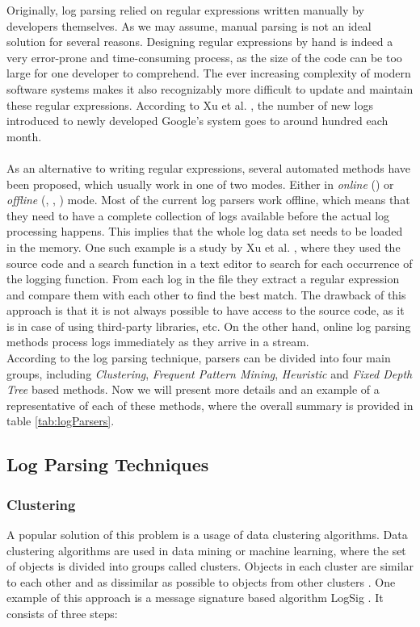 Originally, log parsing relied on regular expressions written manually by developers themselves. As we may assume, manual parsing is not an ideal solution for several reasons. Designing regular expressions by hand is indeed a very error-prone and time-consuming process, as the size of the code can be too large for one developer to comprehend. The ever increasing complexity of modern software systems makes it also recognizably more difficult to update and maintain these regular expressions. According to Xu et al. \cite{xu2009}, the number of new logs introduced to newly developed Google's system goes to around hundred each month. \\
\\
As an alternative to writing regular expressions, several automated methods have been proposed, which usually work in one of two modes. Either in \textit{online} (\cite{drain2017}) or \textit{offline} (\cite{vaarandi2003}, \cite{logsig2011}, \cite{Makanju2009ALA}) mode. Most of the current log parsers work offline, which means that they need to have a complete collection of logs available before the actual log processing happens. This implies that the whole log data set needs to be loaded in the memory. One such example is a study by Xu et al. \cite{xu2008}, where they used the source code and a search function in a text editor to search for each occurrence of the logging function. From each log in the file they extract a regular expression and compare them with each other to find the best match. The drawback of this approach is that it is not always possible to have access to the source code, as it is in case of using third-party libraries, etc. On the other hand, online log parsing methods process logs immediately as they arrive in a stream. \\
According to the log parsing technique, parsers can be divided into four main groups, including \textit{Clustering}, \textit{Frequent Pattern Mining}, \textit{Heuristic} and \textit{Fixed Depth Tree} based methods. Now we will present more details and an example of a representative of each of these methods, where the overall summary is provided in table \ref{tab:logParsers}.  \\

\subsection{Log Parsing Techniques} \label{log_parsing_techniques}
    
    \subsubsection*{Clustering} 
    A popular solution of this problem is a usage of data clustering algorithms. Data clustering algorithms are used in data mining or machine learning, where the set of objects is divided into groups called clusters. Objects in each cluster are similar to each other and as dissimilar as possible to objects from other clusters \cite{vaarandi2003}. One example of this approach is a message signature based algorithm LogSig \cite{logsig2011}. It consists of three steps: 
    
